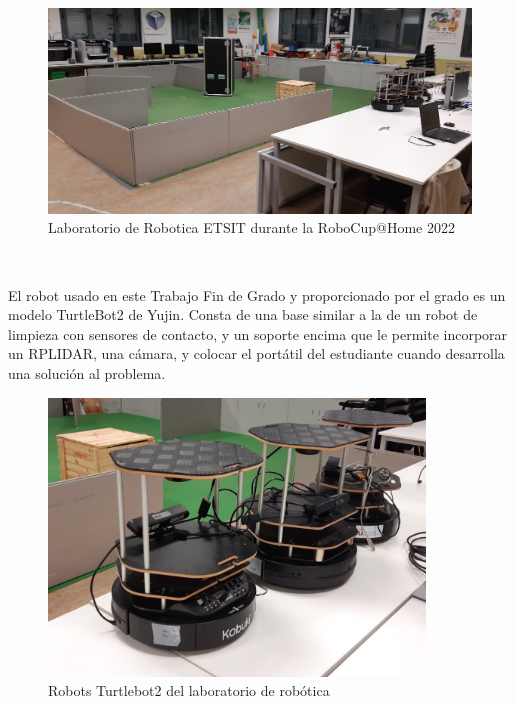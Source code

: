 \begin{figure}[H]
  \begin{center}
    \includegraphics[width=12cm]{imagenes/cap1/laboratorio-robotica.png}
  \end{center}
  \caption[Laboratorio de Robotica ETSIT durante la RoboCup@Home 2022]{Laboratorio de Robotica ETSIT durante la RoboCup@Home 2022}
  \label{fig:laboratorio_robocup}
\end{figure}\

El robot usado en este Trabajo Fin de Grado y proporcionado por el grado es un modelo TurtleBot2 de Yujin. Consta de una base  similar a la de un robot de limpieza con sensores de contacto, y un soporte encima que le permite incorporar un RPLIDAR, una cámara, y colocar el portátil del estudiante cuando desarrolla una solución al problema.\\

\begin{figure}[H]
  \begin{center}
    \includegraphics[width=10cm]{imagenes/cap1/robots-turtlebot2-laboratorio.png}
  \end{center}
  \caption[Robots Turtlebot2 del laboratorio de robótica]{Robots Turtlebot2 del laboratorio de robótica}
  \label{fig:robots_laboratorio_robotica}
\end{figure}\

